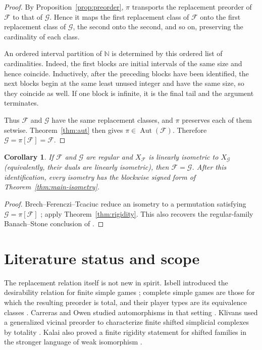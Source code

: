 \documentclass[11pt]{article}
\newtheorem{corollary}[theorem]{Corollary}
\theoremstyle{definition}
\theoremstyle{remark}
\newcommand{\N}{\mathbb N}
\newcommand{\F}{\mathcal F}
\newcommand{\G}{\mathcal G}
\newcommand{\Aut}{\operatorname{Aut}}
\begin{document}
\begin{proof}
By Proposition~\ref{prop:preorder}, $\pi$ transports the replacement preorder
of $\F$ to that of $\G$.  Hence it maps the first replacement class of $\F$
onto the first replacement class of $\G$, the second onto the second, and so
on, preserving the cardinality of each class.

An ordered interval partition of $\N$ is determined by this ordered list of
cardinalities.  Indeed, the first blocks are initial intervals of the same
size and hence coincide.  Inductively, after the preceding blocks have been
identified, the next blocks begin at the same least unused integer and have
the same size, so they coincide as well.  If one block is infinite, it is the
final tail and the argument terminates.

Thus $\F$ and $\G$ have the same replacement classes, and $\pi$ preserves
each of them setwise.  Theorem~\ref{thm:aut} then gives
$\pi\in\Aut(\F)$.  Therefore $\G=\pi[\F]=\F$.
\end{proof}

\begin{corollary}
If $\F$ and $\G$ are regular and $X_{\F}$ is linearly isometric to
$X_{\G}$ (equivalently, their duals are linearly isometric), then
$\F=\G$.  After this identification, every isometry has the blockwise signed
form of Theorem~\ref{thm:main-isometry}.
\end{corollary}

\begin{proof}
Brech--Ferenczi--Tcaciuc reduce an isometry to a permutation satisfying
$\G=\pi[\F]$ \cite[Corollary~12]{BFT}; apply
Theorem~\ref{thm:rigidity}.  This also recovers the regular-family
Banach--Stone conclusion of \cite[Corollary~15]{BP}.
\end{proof}

\section{Literature status and scope}

The replacement relation itself is not new in spirit.  Isbell introduced the
desirability relation for finite simple games \cite{Isbell}; complete simple
games are those for which the resulting preorder is total, and their player
types are its equivalence classes \cite{CarrerasFreixas}.  Carreras and Owen
studied automorphisms in that setting \cite{CarrerasOwen}.  Klivans used a
generalized vicinal preorder to characterize finite shifted simplicial
complexes by totality \cite{Klivans}.  Kalai also proved a finite rigidity
statement for shifted families in the stronger language of weak isomorphism
\cite[Proposition~4.2]{Kalai}.
\end{document}
